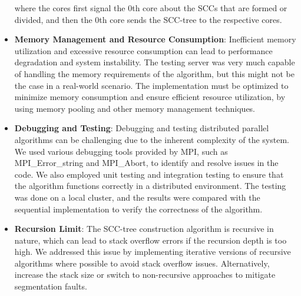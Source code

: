 \begin{itemize}
where the cores first signal the 0th core about the SCCs that are formed or divided, and then the 0th core sends the SCC-tree to the respective cores.
    \item \textbf{Memory Management and Resource Consumption}:  Inefficient memory utilization and excessive resource consumption can lead to performance degradation and system instability.
The testing server was very much capable of handling the memory requirements of the algorithm, but this might not be the case in a real-world scenario.
The implementation must be optimized to minimize memory consumption and ensure efficient resource utilization, by using memory pooling and other memory management techniques.
    \item \textbf{Debugging and Testing}: Debugging and testing distributed parallel algorithms can be challenging due to the inherent complexity of the system.
We used various debugging tools provided by MPI, such as MPI\_Error\_string and MPI\_Abort, to identify and resolve issues in the code. 
We also employed unit testing and integration testing to ensure that the algorithm functions correctly in a distributed environment.
The testing was done on a local cluster, and the results were compared with the sequential implementation to verify the correctness of the algorithm.
    \item \textbf{Recursion Limit}: The SCC-tree construction algorithm is recursive in nature, which can lead to stack overflow errors if the recursion depth is too high.
We addressed this issue by implementing iterative versions of recursive algorithms where possible to avoid stack overflow issues. 
Alternatively, increase the stack size or switch to non-recursive approaches to mitigate segmentation faults.
\end{itemize}
